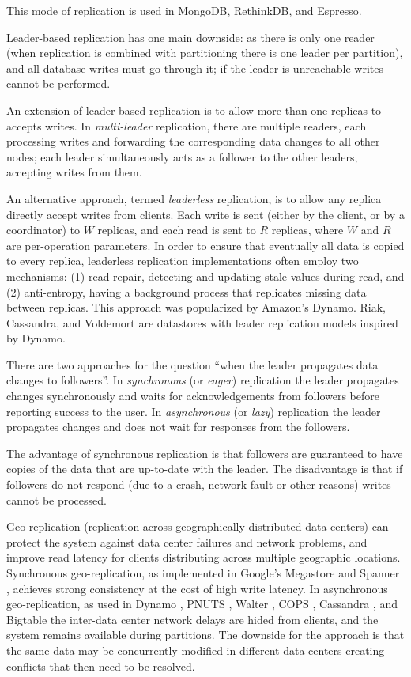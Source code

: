 This mode of replication is used in MongoDB, RethinkDB, and Espresso.

Leader-based replication has one main downside: as there is only one reader (when replication is combined with partitioning there is one leader per partition),
and all database writes must go through it; if the leader is unreachable writes cannot be performed.

An extension of leader-based replication is to allow more than one replicas to accepts writes.
In \textit{multi-leader} replication, there are multiple readers, each processing writes and forwarding the corresponding data changes to all other nodes;
each leader simultaneously acts as a follower to the other leaders, accepting writes from them.

An alternative approach, termed \textit{leaderless} replication, is to allow any replica directly accept writes from clients.
Each write is sent (either by the client, or by a coordinator) to $W$ replicas, and each read is sent to $R$ replicas,
where $W$ and $R$ are per-operation parameters.
In order to ensure that eventually all data is copied to every replica, leaderless replication implementations often employ two mechanisms:
(1) read repair, detecting and updating stale values during read, and (2) anti-entropy, having a background process that replicates missing data between replicas.
This approach was popularized by Amazon's Dynamo.
Riak, Cassandra, and Voldemort are datastores with leader replication models inspired by Dynamo.

\bigskip
\noindent
There are two approaches for the question ``when the leader propagates data changes to followers''.
In \textit{synchronous} (or \textit{eager}) replication the leader propagates changes synchronously and waits for acknowledgements from followers before reporting
success to the user.
In \textit{asynchronous} (or \textit{lazy}) replication the leader propagates changes and does not wait for responses from the followers.

The advantage of synchronous replication is that followers are guaranteed to have copies of the data that are up-to-date with the leader.
The disadvantage is that if followers do not respond (due to a crash, network fault or other reasons) writes cannot be processed.

\bigskip
\noindent
Geo-replication (replication across geographically distributed data centers) can protect the system against data center failures and network problems,
and improve read latency for clients distributing across multiple geographic locations.
Synchronous geo-replication, as implemented in Google's Megastore \cite{baker:megastore} and Spanner \cite{corbett:spanner, bacon:spanner},
achieves strong consistency at the cost of high write latency.
In asynchronous geo-replication, as used in Dynamo \cite{deCandia:dynamo}, PNUTS \cite{cooper:pnuts08, cooper:pnuts19},
Walter \cite{sovran:walter}, COPS \cite{lloyd:cops}, Cassandra \cite{lakshman:cassandra}, and Bigtable \cite{chang:bigtable}
the inter-data center network delays are hided from clients, and the system remains available during partitions.
The downside for the approach is that the same data may be concurrently modified in different data centers creating
conflicts that then need to be resolved.


